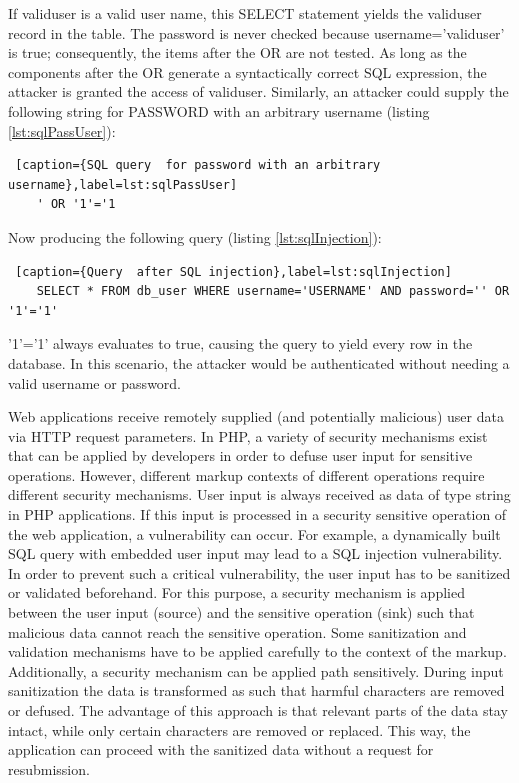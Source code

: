 If validuser is a valid user name, this SELECT statement yields the validuser record in the table. The password is never checked because username='validuser' is true; consequently, the items after the OR are not tested. As long as the components after the OR generate a syntactically correct SQL expression, the attacker is granted the access of validuser. Similarly, an attacker could supply the following string for PASSWORD with an arbitrary username (listing \ref{lst:sqlPassUser}):

\begin{lstlisting} [caption={SQL query  for password with an arbitrary username},label=lst:sqlPassUser]
	' OR '1'='1
\end{lstlisting}

Now producing the following query (listing \ref{lst:sqlInjection}):

\begin{lstlisting} [caption={Query  after SQL injection},label=lst:sqlInjection]
	SELECT * FROM db_user WHERE username='USERNAME' AND password='' OR '1'='1'
\end{lstlisting}
'1'='1' always evaluates to true, causing the query to yield every row in the database. In this scenario, the attacker would be authenticated without needing a valid username or password.

Web applications receive remotely supplied (and potentially
malicious) user data via HTTP request parameters. In PHP, a variety of security mechanisms exist that can be applied by developers in order to defuse user input for sensitive operations. However, different markup contexts of different operations require different security mechanisms.
User input is always received as data of type string in PHP applications. If this input is processed in a security sensitive 
operation of the web application, a vulnerability can
occur. For example, a dynamically built SQL query with
embedded user input may lead to a SQL injection vulnerability. In order to prevent such a critical vulnerability, the
user input has to be sanitized or validated beforehand. For
this purpose, a security mechanism is applied between the
user input (source) and the sensitive operation (sink) such
that malicious data cannot reach the sensitive operation.
Some sanitization and validation mechanisms have to be applied carefully to the context of the markup. Additionally, a security mechanism can be applied path sensitively. During input sanitization the data is
transformed as such that harmful characters are removed or defused.
The advantage of this approach is that relevant parts of the data stay intact, while only certain characters are removed
or replaced. This way, the application can proceed
with the sanitized data without a request for resubmission.


